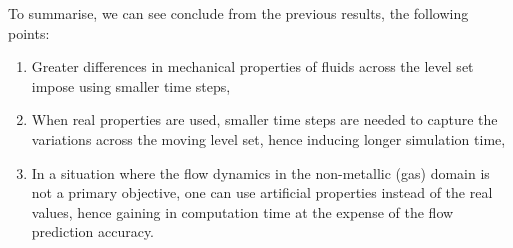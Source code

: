 To summarise, we can see conclude from the previous results, the following points:
\begin{enumerate}
	\itemsep0em 
	\item Greater differences in mechanical properties of fluids across the level set impose using smaller time steps,
	\item When real properties are used, smaller time steps are needed to capture the variations across the moving level set, hence inducing longer simulation time,
	\item In a situation where the flow dynamics in the non-metallic (gas) domain is not a primary objective, one can 
		   use artificial properties instead of the real values, hence gaining in computation time at the expense of the flow prediction accuracy.
\end{enumerate}  
